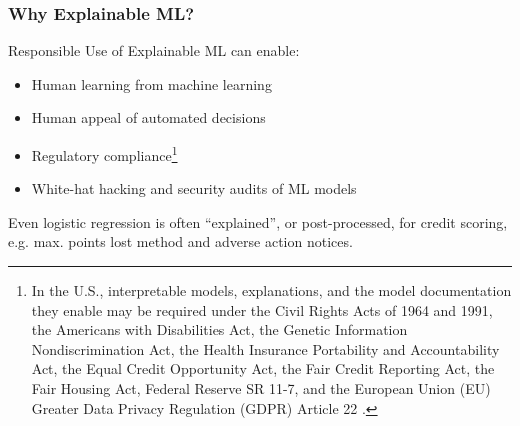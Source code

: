 \documentclass[11pt,aspectratio=169,hyperref={colorlinks}]{beamer}
\begin{document}
	\begin{frame}
	
		\frametitle{Why Explainable ML?}
		
		Responsible Use of Explainable ML can enable:
		\begin{itemize}
			\item Human learning from machine learning
			\item Human appeal of automated decisions
			\item Regulatory compliance\footnote{\tiny{In the U.S., interpretable models, explanations, and the model documentation they enable may be required under the Civil Rights Acts of 1964 and 1991, the Americans with Disabilities Act, the Genetic Information Nondiscrimination Act, the Health Insurance Portability and Accountability Act, the Equal Credit Opportunity Act, the Fair Credit Reporting Act, the Fair Housing Act, Federal Reserve SR 11-7, and the European Union (EU) Greater Data Privacy Regulation (GDPR) Article 22 \cite{ff_interpretability}.}}
			\item White-hat hacking and security audits of ML models
		\end{itemize}
		\vspace{10pt}
		Even logistic regression is often ``explained'',  or post-processed, for credit scoring, e.g. max. points lost method and adverse action notices.

	\end{frame}
\end{document}
